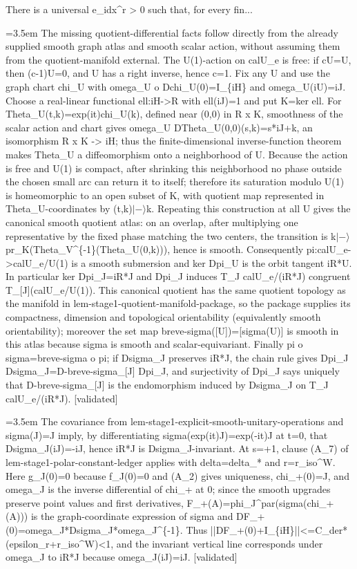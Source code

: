 \documentclass{article}
\newcommand{\step}[1]{\par\noindent\hangindent=3.5em\hangafter=1%
  \makebox[3.5em][l]{\textbf{#1.}}}
\newcommand{\steptag}[1]{\hfill{\small\textsf{[#1]}}}
\begin{document}
\begin{proofbox}{There is a universal e\_idx\textasciicircum{}r > 0 such that, for every fin...}
\step{1.2.2.1} The missing quotient-differential facts follow directly from the already supplied smooth graph atlas and smooth scalar action, without assuming them from the quotient-manifold external.  The U(1)-action on calU\_e is free: if cU=U, then (c-1)U=0, and U has a right inverse, hence c=1.  Fix any U and use the graph chart chi\_U with omega\_U o Dchi\_U(0)=I\_\{iH\} and omega\_U(iU)=iJ.  Choose a real-linear functional ell:iH->R with ell(iJ)=1 and put K=ker ell.  For Theta\_U(t,k)=exp(it)chi\_U(k), defined near (0,0) in R x K, smoothness of the scalar action and chart gives omega\_U DTheta\_U(0,0)(s,k)=s*iJ+k, an isomorphism R x K -> iH; thus the finite-dimensional inverse-function theorem makes Theta\_U a diffeomorphism onto a neighborhood of U.  Because the action is free and U(1) is compact, after shrinking this neighborhood no phase outside the chosen small arc can return it to itself; therefore its saturation modulo U(1) is homeomorphic to an open subset of K, with quotient map represented in Theta\_U-coordinates by (t,k)$|-\rangle$k.  Repeating this construction at all U gives the canonical smooth quotient atlas: on an overlap, after multiplying one representative by the fixed phase matching the two centers, the transition is k$|-\rangle$pr\_K(Theta\_V\textasciicircum{}\{-1\}(Theta\_U(0,k))), hence is smooth.  Consequently pi:calU\_e->calU\_e/U(1) is a smooth submersion and ker Dpi\_U is the orbit tangent iR*U.  In particular ker Dpi\_J=iR*J and Dpi\_J induces T\_J calU\_e/(iR*J) congruent T\_[J](calU\_e/U(1)).  This canonical quotient has the same quotient topology as the manifold in lem-stage1-quotient-manifold-package, so the package supplies its compactness, dimension and topological orientability (equivalently smooth orientability); moreover the set map breve-sigma([U])=[sigma(U)] is smooth in this atlas because sigma is smooth and scalar-equivariant.  Finally pi o sigma=breve-sigma o pi; if Dsigma\_J preserves iR*J, the chain rule gives Dpi\_J Dsigma\_J=D-breve-sigma\_[J] Dpi\_J, and surjectivity of Dpi\_J says uniquely that D-breve-sigma\_[J] is the endomorphism induced by Dsigma\_J on T\_J calU\_e/(iR*J). \steptag{validated} \\[4pt]
\step{1.3} The covariance from lem-stage1-explicit-smooth-unitary-operations and sigma(J)=J imply, by differentiating sigma(exp(it)J)=exp(-it)J at t=0, that Dsigma\_J(iJ)=-iJ, hence iR*J is Dsigma\_J-invariant. At s=+1, clause (A\_7) of lem-stage1-polar-constant-ledger applies with delta=delta\_* and r=r\_iso\textasciicircum{}W. Here g\_J(0)=0 because f\_J(0)=0 and (A\_2) gives uniqueness, chi\_+(0)=J, and omega\_J is the inverse differential of chi\_+ at 0; since the smooth upgrades preserve point values and first derivatives, F\_+(A)=phi\_J\textasciicircum{}par(sigma(chi\_+(A))) is the graph-coordinate expression of sigma and DF\_+(0)=omega\_J*Dsigma\_J*omega\_J\textasciicircum{}\{-1\}. Thus ||DF\_+(0)+I\_\{iH\}||<=C\_der*(epsilon\_r+r\_iso\textasciicircum{}W)<1, and the invariant vertical line corresponds under omega\_J to iR*J because omega\_J(iJ)=iJ. \steptag{validated} \\[4pt]

\end{proofbox}
\end{document}

